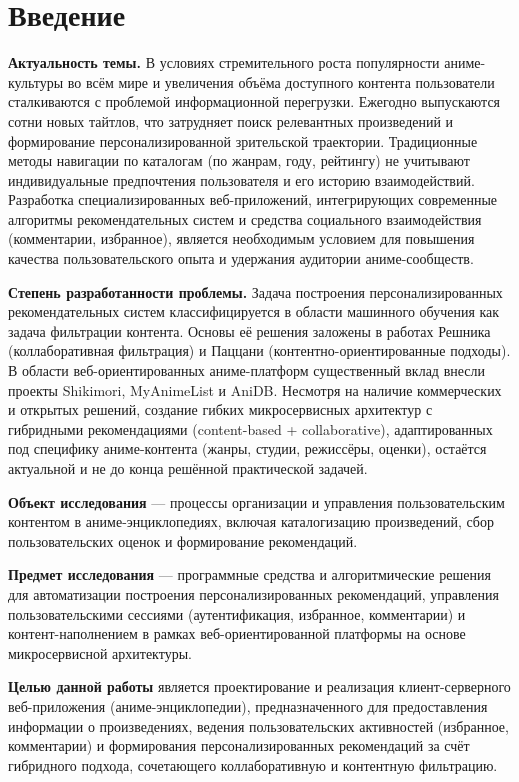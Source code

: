 \section*{Введение}

\textbf{Актуальность темы.} В условиях стремительного роста популярности аниме-культуры во всём мире и увеличения объёма доступного контента пользователи сталкиваются с проблемой информационной перегрузки. Ежегодно выпускаются сотни новых тайтлов, что затрудняет поиск релевантных произведений и формирование персонализированной зрительской траектории. Традиционные методы навигации по каталогам (по жанрам, году, рейтингу) не учитывают индивидуальные предпочтения пользователя и его историю взаимодействий. Разработка специализированных веб-приложений, интегрирующих современные алгоритмы рекомендательных систем и средства социального взаимодействия (комментарии, избранное), является необходимым условием для повышения качества пользовательского опыта и удержания аудитории аниме-сообществ.

\textbf{Степень разработанности проблемы.} Задача построения персонализированных рекомендательных систем классифицируется в области машинного обучения как задача фильтрации контента. Основы её решения заложены в работах Решника (коллаборативная фильтрация) и Паццани (контентно-ориентированные подходы). В области веб-ориентированных аниме-платформ существенный вклад внесли проекты Shikimori, MyAnimeList и AniDB. Несмотря на наличие коммерческих и открытых решений, создание гибких микросервисных архитектур с гибридными рекомендациями (content-based + collaborative), адаптированных под специфику аниме-контента (жанры, студии, режиссёры, оценки), остаётся актуальной и не до конца решённой практической задачей.

\textbf{Объект исследования} — процессы организации и управления пользовательским контентом в аниме-энциклопедиях, включая каталогизацию произведений, сбор пользовательских оценок и формирование рекомендаций.

\textbf{Предмет исследования} — программные средства и алгоритмические решения для автоматизации построения персонализированных рекомендаций, управления пользовательскими сессиями (аутентификация, избранное, комментарии) и контент-наполнением в рамках веб-ориентированной платформы на основе микросервисной архитектуры.

\textbf{Целью данной работы} является проектирование и реализация клиент-серверного веб-приложения (аниме-энциклопедии), предназначенного для предоставления информации о произведениях, ведения пользовательских активностей (избранное, комментарии) и формирования персонализированных рекомендаций за счёт гибридного подхода, сочетающего коллаборативную и контентную фильтрацию.